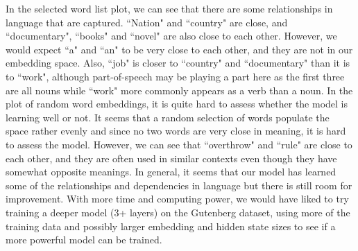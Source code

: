 \documentclass[a4paper]{article}
\begin{document}
In the selected word list plot, we can see that there are some relationships in language that are captured. ``Nation" and ``country" are close, and ``documentary", ``books" and ``novel" are also close to each other. However, we would expect ``a" and ``an" to be very close to each other, and they are not in our embedding space. Also, ``job" is closer to ``country" and ``documentary" than it is to ``work", although part-of-speech may be playing a part here as the first three are all nouns while ``work" more commonly appears as a verb than a noun. 
\newline
\newline
In the plot of random word embeddings, it is quite hard to assess whether the model is learning well or not. It seems that a random selection of words populate the space rather evenly and since no two words are very close in meaning, it is hard to assess the model. However, we can see that ``overthrow" and ``rule" are close to each other, and they are often used in similar contexts even though they have somewhat opposite meanings.
\newline
\newline
In general, it seems that our model has learned some of the relationships and dependencies in language but there is still room for improvement. With more time and computing power, we would have liked to try training a deeper model (3+ layers) on the Gutenberg dataset, using more of the training data and possibly larger embedding and hidden state sizes to see if a more powerful model can be trained.  
\end{document}
